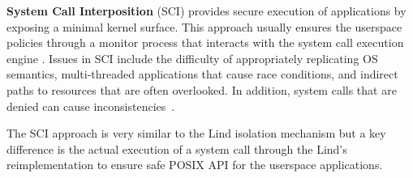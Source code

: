 
\textbf{System Call Interposition} (SCI) provides
secure execution of applications by exposing a minimal kernel surface.
This approach usually ensures the userspace policies through a monitor process that
interacts with the system call execution engine
\cite{SCI-04}.
Issues in SCI include the difficulty of appropriately replicating OS semantics,
multi-threaded applications that cause race conditions, and indirect paths to resources that are often overlooked.
In addition, system calls that are denied can cause inconsistencies~\cite{Problems-SCI}.
%

%
%
%
The SCI approach is very similar to the Lind isolation mechanism but a key difference is the actual execution
of a system call through the Lind's reimplementation to ensure safe POSIX API for the userspace applications.

